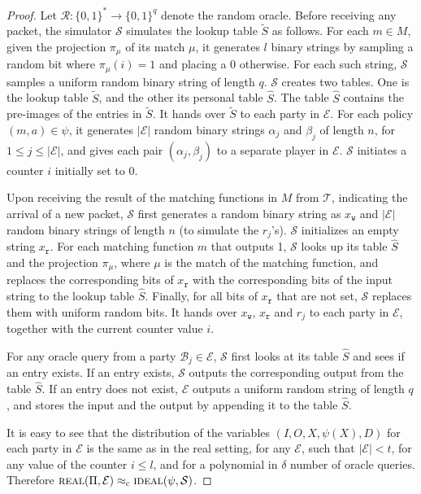 \RequirePackage{fix-cm} \let\oldvec\vec \documentclass{sig-alternate-05-2015}
\begin{document}
\begin{proof}
Let $\mathcal{R}: \{0, 1\}^* \rightarrow \{0, 1\}^{q}$ denote the random oracle. Before receiving any packet, the simulator $\mathcal{S}$ simulates the lookup table $\tilde{S}$ as follows. For each $m \in M$, given the projection $\pi_\mu$ of its match $\mu$, it generates $l$ binary strings by sampling a random bit where $\pi_\mu(i) = 1$ and placing a $0$ otherwise. For each such string, $\mathcal{S}$ samples a uniform random binary string of length $q$. $\mathcal{S}$ creates two tables. One is the lookup table $\tilde{S}$, and the other its personal table $\hat{S}$. The table $\hat{S}$ contains the pre-images of the entries in $\tilde{S}$. It hands over $\tilde{S}$ to each party in $\mathcal{E}$. For each policy $(m, a) \in \psi$, it generates $|\mathcal{E}|$ random binary strings $\alpha_j$ and $\beta_j$ of length $n$, for $1 \le j \le |\mathcal{E}|$, and gives each pair $(\alpha_j, \beta_j)$ to a separate player in $\mathcal{E}$. $\mathcal{S}$ initiates a counter $i$ initially set to $0$.

Upon receiving the result of the matching functions in $M$ from $\mathcal{T}$, indicating the arrival of a new packet, $\mathcal{S}$ first generates a random binary string as $x_{\mathtt{w}}$ and $|\mathcal{E}|$ random binary strings of length $n$ (to simulate the $r_j$'s). $\mathcal{S}$ initializes an empty string $x_{\mathtt{r}}$. For each matching function $m$ that outputs 1, $\mathcal{S}$ looks up its table $\hat{S}$ and the projection $\pi_{\mu}$, where $\mu$ is the match of the matching function, and replaces the corresponding bits of $x_{\mathtt{r}}$ with the corresponding bits of the input string to the lookup table $\hat{S}$. Finally, for all bits of $x_{\mathtt{r}}$ that are not set, $\mathcal{S}$ replaces them with uniform random bits. It hands over $x_{\mathtt{w}}$, $x_{\mathtt{r}}$ and $r_j$ to each party in $\mathcal{E}$, together with the current counter value $i$. 

For any oracle query from a party $\mathcal{B}_j \in \mathcal{E}$, $\mathcal{S}$ first looks at its table $\hat{S}$ and sees if an entry exists. If an entry exists, $\mathcal{S}$ outputs the corresponding output from the table $\hat{S}$. If an entry does not exist, $\mathcal{E}$ outputs a uniform random string of length $q$, and stores the input and the output by appending it to the table $\hat{S}$. 

It is easy to see that the distribution of the variables $(I, O, X, \psi(X), D)$ for each party in $\mathcal{E}$ is the same as in the real setting, for any $\mathcal{E}$, such that $|\mathcal{E}| < t$, for any value of the counter $i \le l$, and for a polynomial in $\delta$ number of oracle queries. Therefore $\textsc{real}(\Pi, \mathcal{E})	 \approx_{\text{c}} \textsc{ideal}(\psi, \mathcal{S})$.
\end{proof}

\fi
\end{document}
